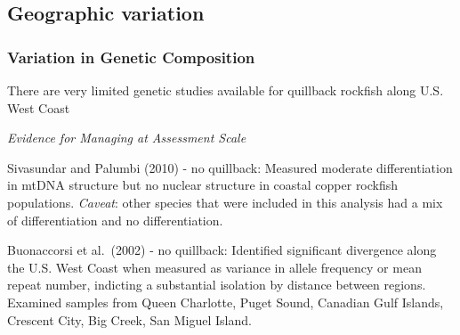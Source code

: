 \documentclass[11pt,
  english,
  letterpaper,
]{article}
\begin{document}
\leavevmode\tagmcend\tagstructend\par


\hypertarget{geographic-variation}{%
\subsection{Geographic variation}\label{geographic-variation}}

\leavevmode\tagmcend\tagstructend


\hypertarget{variation-in-genetic-composition}{%
\subsubsection{Variation in Genetic Composition}\label{variation-in-genetic-composition}}

\leavevmode\tagmcend\tagstructend


There are very limited genetic studies available for quillback rockfish along U.S. West Coast

\leavevmode\tagmcend\tagstructend\par


\emph{Evidence for Managing at Assessment Scale}

\leavevmode\tagmcend\tagstructend\par


Sivasundar and Palumbi {(2010)\leavevmode\tagmcend\tagstructend} - no quillback: Measured moderate differentiation in mtDNA structure but no nuclear structure in coastal copper rockfish populations. \emph{Caveat}: other species that were included in this analysis had a mix of differentiation and no differentiation.

\leavevmode\tagmcend\tagstructend\par


Buonaccorsi et al.~{(2002)\leavevmode\tagmcend\tagstructend} - no quillback: Identified significant divergence along the U.S. West Coast when measured as variance in allele frequency or mean repeat number, indicting a substantial isolation by distance between regions. Examined samples from Queen Charlotte, Puget Sound, Canadian Gulf Islands, Crescent City, Big Creek, San Miguel Island.
\end{document}
